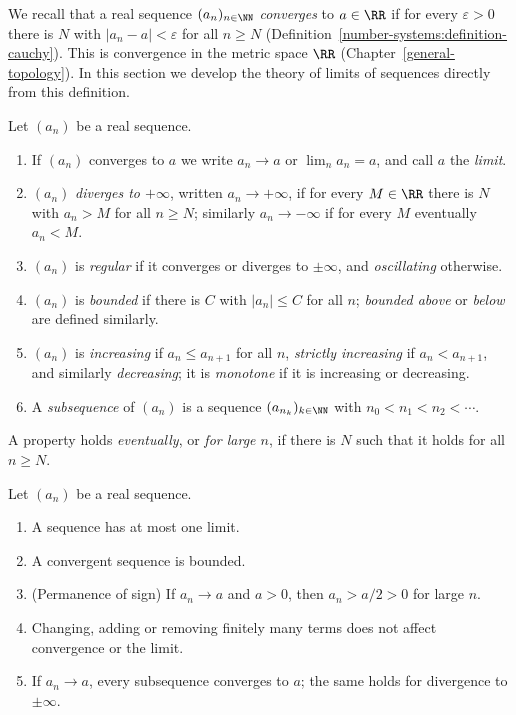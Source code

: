 We recall that a real sequence $(a_n)_{n \in \NN}$ \emph{converges} to $a \in \RR$ if for every $\varepsilon > 0$ there is $N$ with $|a_n - a| < \varepsilon$ for all $n \geq N$
(Definition~\ref{number-systems:definition-cauchy}). This is convergence in the metric space $\RR$ (Chapter~\ref{general-topology}). In this section we develop the theory of limits of sequences directly
from this definition.

\begin{definition}\label{real-analysis:definition-sequence-terms}
Let $(a_n)$ be a real sequence.
\begin{enumerate}
\item If $(a_n)$ converges to $a$ we write $a_n \to a$ or $\lim_na_n = a$, and call $a$ the \emph{limit}.
\item $(a_n)$ \emph{diverges to $+\infty$}, written $a_n \to +\infty$, if for every $M \in \RR$ there is $N$ with $a_n > M$ for all $n \geq N$; similarly $a_n \to -\infty$ if for every $M$ eventually $a_n < M$.
\item $(a_n)$ is \emph{regular} if it converges or diverges to $\pm\infty$, and \emph{oscillating} otherwise.
\item $(a_n)$ is \emph{bounded} if there is $C$ with $|a_n| \leq C$ for all $n$; \emph{bounded above} or \emph{below} are defined similarly.
\item $(a_n)$ is \emph{increasing} if $a_n \leq a_{n+1}$ for all $n$, \emph{strictly increasing} if $a_n < a_{n+1}$, and similarly \emph{decreasing}; it is \emph{monotone} if it is increasing or decreasing.
\item A \emph{subsequence} of $(a_n)$ is a sequence $(a_{n_k})_{k \in \NN}$ with $n_0 < n_1 < n_2 < \cdots$.
\end{enumerate}
A property holds \emph{eventually}, or \emph{for large $n$}, if there is $N$ such that it holds for all $n \geq N$.
\end{definition}

\begin{proposition}\label{real-analysis:proposition-sequence-basic}
Let $(a_n)$ be a real sequence.
\begin{enumerate}
\item A sequence has at most one limit.
\item A convergent sequence is bounded.
\item (Permanence of sign) If $a_n \to a$ and $a > 0$, then $a_n > a/2 > 0$ for large $n$.
\item Changing, adding or removing finitely many terms does not affect convergence or the limit.
\item If $a_n \to a$, every subsequence converges to $a$; the same holds for divergence to $\pm\infty$.
\end{enumerate}
\end{proposition}

